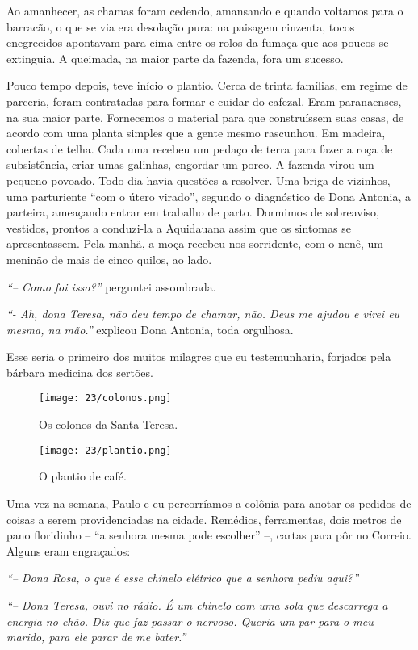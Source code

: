 Ao amanhecer, as chamas foram cedendo, amansando e quando voltamos para o barracão, o que se via era desolação pura: na paisagem cinzenta, tocos enegrecidos apontavam para cima entre os rolos da fumaça que aos poucos se extinguia.
A queimada, na maior parte da fazenda, fora um sucesso.

Pouco tempo depois, teve início o plantio.
Cerca de trinta famílias, em regime de parceria, foram contratadas para formar e cuidar do cafezal.
Eram paranaenses, na sua maior parte.
Fornecemos o material para que construíssem suas casas, de acordo com uma planta simples que a gente mesmo rascunhou.
Em madeira, cobertas de telha.
Cada uma recebeu um pedaço de terra para fazer a roça de subsistência, criar umas galinhas, engordar um porco.
A fazenda virou um pequeno povoado.
Todo dia havia questões a resolver.
Uma briga de vizinhos, uma parturiente ``com o útero virado'', segundo o diagnóstico de Dona Antonia, a parteira, ameaçando entrar em trabalho de parto.
Dormimos de sobreaviso, vestidos, prontos a conduzi-la a Aquidauana assim que os sintomas se apresentassem.
Pela manhã, a moça recebeu-nos sorridente, com o nenê, um meninão de mais de cinco quilos, ao lado.

\textit{``-- Como foi isso?''} perguntei assombrada.

\textit{``- Ah, dona Teresa, não deu tempo de chamar, não.
Deus me ajudou e virei eu mesma, na mão.''} explicou Dona Antonia, toda orgulhosa.
 
Esse seria o primeiro dos muitos milagres que eu testemunharia, forjados pela bárbara medicina dos sertões.

\begin{figure}
\centering
\texttt{[image: 23/colonos.png]}
\caption{Os colonos da Santa Teresa.}
\end{figure}

\begin{figure}
\centering
\texttt{[image: 23/plantio.png]}
\caption{O plantio de café.}
\end{figure}

Uma vez na semana, Paulo e eu percorríamos a colônia para anotar os pedidos de coisas a serem providenciadas na cidade.
Remédios, ferramentas, dois metros de pano floridinho -- ``a senhora mesma pode escolher'' --, cartas para pôr no Correio.
Alguns eram engraçados: 

\textit{``-- Dona Rosa, o que é esse chinelo elétrico que a senhora pediu aqui?'' }

\textit{``-- Dona Teresa, ouvi no rádio.
É um chinelo com uma sola que descarrega a energia no chão.
Diz que faz passar o nervoso.
Queria um par para o meu marido, para ele parar de me bater.'' }

